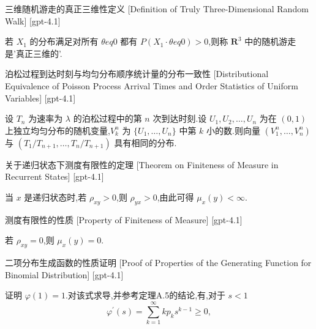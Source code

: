 \documentclass[UTF8]{ctexart}
\begin{document}
    
    
    \begin{dfn}
        {三维随机游走的真正三维性定义}
        [Definition of Truly Three-Dimensional Random Walk]
        [gpt-4.1]
        
若 $X_1$ 的分布满足对所有 $\theta 
eq 0$ 都有 $P ( X_1 \cdot \theta 
eq 0 ) > 0$,则称 $\mathbf{R}^3$ 中的随机游走是'真正三维的'.

    \end{dfn}
    
    
    
    \begin{thm}
        {泊松过程到达时刻与均匀分布顺序统计量的分布一致性}
        [Distributional Equivalence of Poisson Process Arrival Times and Order Statistics of Uniform Variables]
        [gpt-4.1]
        
设 $T_n$ 为速率为 $\lambda$ 的泊松过程中的第 $n$ 次到达时刻.设 $U_1, U_2, \dots, U_n$ 为在 $(0, 1)$ 上独立均匀分布的随机变量,$V_k^n$ 为 $\{U_1, \ldots, U_n\}$ 中第 $k$ 小的数.则向量 $(V_1^n, \ldots, V_n^n)$ 与 $(T_1 / T_{n+1}, \ldots, T_n / T_{n+1})$ 具有相同的分布.

    \end{thm}
    
    
    
    \begin{thm}
        {关于递归状态下测度有限性的定理}
        [Theorem on Finiteness of Measure in Recurrent States]
        [gpt-4.1]
        
当 $x$ 是递归状态时,若 $\rho_{xy} > 0$,则 $\rho_{yx} > 0$,由此可得 $\mu_{x}(y) < \infty$.

    \end{thm}
    
    
    
    \begin{ppt}
        {测度有限性的性质}
        [Property of Finiteness of Measure]
        [gpt-4.1]
        
若 $\rho_{xy} = 0$,则 $\mu_{x}(y) = 0$.

    \end{ppt}
    
    
    
    \begin{prf}
        {二项分布生成函数的性质证明}
        [Proof of Properties of the Generating Function for Binomial Distribution]
        [gpt-4.1]
        
证明 $\varphi ( 1 ) = 1$.对该式求导,并参考定理A.5的结论,有,对于 $s < 1$
\[
\varphi ^ { \prime } ( s ) = \sum _ { k = 1 } ^ { \infty } k p _ { k } s ^ { k - 1 } \geq 0,
\]

    \end{prf}
    
\end{document}
